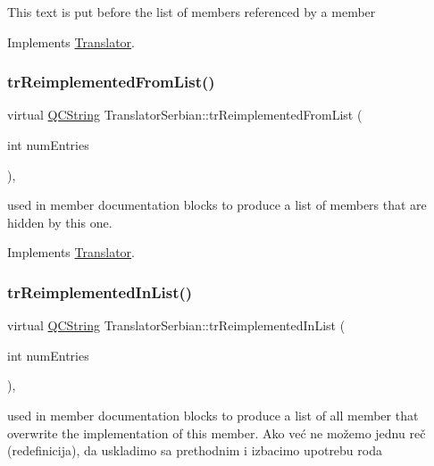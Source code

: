 This text is put before the list of members referenced by a member 

Implements \mbox{\hyperlink{class_translator}{Translator}}.

\mbox{\label{class_translator_serbian_ab7fa5ecfcb8a4046516fd67a44dd89b4}} 
\subsubsection{\texorpdfstring{trReimplementedFromList()}{trReimplementedFromList()}}
{\footnotesize\ttfamily virtual \mbox{\hyperlink{class_q_c_string}{Q\+C\+String}} Translator\+Serbian\+::tr\+Reimplemented\+From\+List (\begin{DoxyParamCaption}\item[{int}]{num\+Entries }\end{DoxyParamCaption})\hspace{0.3cm}{\ttfamily [inline]}, {\ttfamily [virtual]}}

used in member documentation blocks to produce a list of members that are hidden by this one. 

Implements \mbox{\hyperlink{class_translator}{Translator}}.

\mbox{\label{class_translator_serbian_a035c0fb4d8b00e78e0bda87b342ba7dc}} 
\subsubsection{\texorpdfstring{trReimplementedInList()}{trReimplementedInList()}}
{\footnotesize\ttfamily virtual \mbox{\hyperlink{class_q_c_string}{Q\+C\+String}} Translator\+Serbian\+::tr\+Reimplemented\+In\+List (\begin{DoxyParamCaption}\item[{int}]{num\+Entries }\end{DoxyParamCaption})\hspace{0.3cm}{\ttfamily [inline]}, {\ttfamily [virtual]}}

used in member documentation blocks to produce a list of all member that overwrite the implementation of this member. Ako već ne možemo jednu reč (redefinicija), da uskladimo sa prethodnim i izbacimo upotrebu roda

